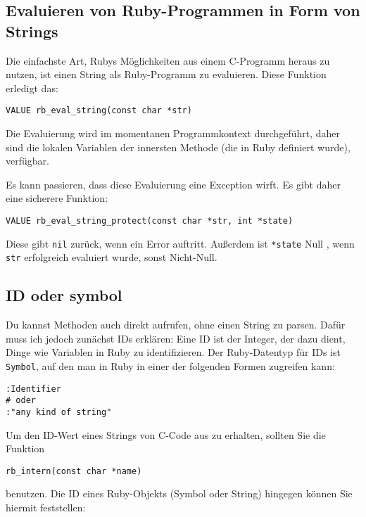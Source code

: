 \subsection{Evaluieren von Ruby-Programmen in Form von Strings}

Die einfachste Art, Rubys Möglichkeiten aus einem C-Programm heraus zu
nutzen, ist einen String als Ruby-Programm zu evaluieren. Diese
Funktion erledigt das:

\begin{lstlisting}
VALUE rb_eval_string(const char *str)
\end{lstlisting}

\noindent Die Evaluierung wird im momentanen Programmkontext
durchgeführt, daher sind die lokalen Variablen der innersten Methode
(die in Ruby definiert wurde), verfügbar.

Es kann passieren, dass diese Evaluierung eine Exception wirft. Es
gibt daher eine sicherere Funktion:

\begin{lstlisting}
VALUE rb_eval_string_protect(const char *str, int *state)
\end{lstlisting}

\noindent Diese gibt \verb+nil+ zurück, wenn ein Error
auftritt. Außerdem ist \verb+*state+ Null , wenn
\verb+str+ erfolgreich evaluiert wurde, sonst Nicht-Null.

\subsection{ID oder symbol}
\label{sec:id-oder-symbol}

Du kannst Methoden auch direkt aufrufen, ohne einen String zu
parsen. Dafür muss ich jedoch zunächst IDs erklären: Eine ID ist der
Integer, der dazu dient, Dinge wie Variablen in Ruby zu
identifizieren. Der Ruby-Datentyp für IDs ist \verb+Symbol+, auf den
man in Ruby in einer der folgenden Formen zugreifen kann:

\begin{lstlisting}
:Identifier
# oder
:"any kind of string"
\end{lstlisting}

Um den ID-Wert eines Strings von C-Code aus zu erhalten, sollten Sie
die Funktion

\begin{lstlisting}
rb_intern(const char *name)
\end{lstlisting}

\noindent benutzen. Die ID eines Ruby-Objekts (Symbol oder String)
hingegen können Sie hiermit feststellen:

